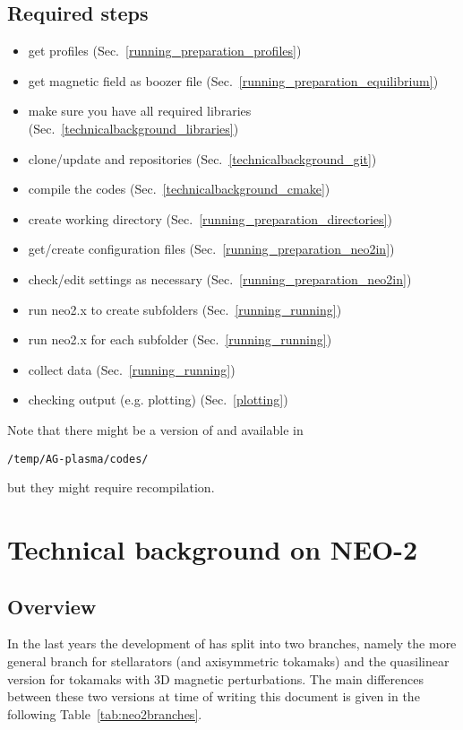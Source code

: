 \documentclass{article}
\newcommand{\vv}[1]{\texttt{\detokenize{#1}}}
\begin{document}
\subsection{Required steps}
\begin{itemize}
  \item get profiles (Sec.~\ref{running_preparation_profiles})
  \item get magnetic field as boozer file (Sec.~\ref{running_preparation_equilibrium})
  \item make sure you have all required libraries (Sec.~\ref{technicalbackground_libraries})
  \item clone/update \vv{libneo} and \vv{NEO-2} repositories (Sec.~\ref{technicalbackground_git})
  \item compile the codes (Sec.~\ref{technicalbackground_cmake})
  \item create working directory (Sec.~\ref{running_preparation_directories})
  \item get/create configuration files (Sec.~\ref{running_preparation_neo2in})
  \item check/edit settings as necessary (Sec.~\ref{running_preparation_neo2in})
  \item run neo2.x to create subfolders (Sec.~\ref{running_running})
  \item run neo2.x for each subfolder (Sec.~\ref{running_running})
  \item collect data (Sec.~\ref{running_running})
  \item checking output (e.g. plotting) (Sec.~\ref{plotting})
\end{itemize}
Note that there might be a version of \vv{libneo} and \vv{NEO-2}
available in
\begin{verbatim}
/temp/AG-plasma/codes/
\end{verbatim}
but they might require recompilation.

\section{Technical background on NEO-2}
\subsection{Overview}
In the last years the development of \vv{NEO-2} has split into two branches,
namely the more general branch for stellarators (and axisymmetric
tokamaks) and the quasilinear version for tokamaks with 3D magnetic
perturbations. The main differences between these two versions at time
of writing this document is given in the following Table~\ref{tab:neo2branches}.
\end{document}
